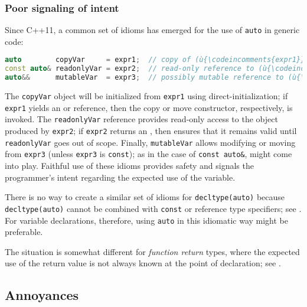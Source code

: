 \subsubsection[Poor signaling of intent]{Poor signaling of intent}\label{poor-signaling-of-intent}

Since C++11, a common set of idioms has emerged for the use of
\lstinline!auto! in generic code:

\begin{lstlisting}[language=C++]
auto        copyVar     = expr1;  // copy of (ù{\codeincomments{expr1}}ù)
const auto& readonlyVar = expr2;  // read-only reference to (ù{\codeincomments{expr1}}ù)
auto&&      mutableVar  = expr3;  // possibly mutable reference to (ù{\codeincomments{expr1}}ù)
\end{lstlisting}
    

The \lstinline!copyVar! object will be initialized from \lstinline!expr1!
using direct-initialization; if \lstinline!expr1! yields an 
or  reference, then the copy or move constructor,
respectively, is invoked. The \lstinline!readonlyVar! reference provides
read-only access to the object produced by \lstinline!expr2!; if
\lstinline!expr2! returns an , then  ensures that it remains valid until \lstinline!readonlyVar! goes
out of scope. Finally, \lstinline!mutableVar! allows modifying or moving
from \lstinline!expr3! (unless \lstinline!expr3! is \lstinline!const!); as in the
case of \lstinline!const!~\lstinline!auto&!, 
might come into play. Faithful use of these idioms provides safety and
signals the programmer's intent regarding the expected use of the
variable.

There is no way to create a similar set of idioms for
\lstinline!decltype(auto)! because \lstinline!decltype(auto)! cannot be
combined with \lstinline!const! or reference type specifiers; see\linebreak%
. For variable
declarations, therefore, using \lstinline!auto! in this idiomatic way might
be preferable.

The situation is somewhat different for \emph{function return} types,
where the expected use of the return value is not always known at the
point of declaration; see .

\subsection[Annoyances]{Annoyances}\label{annoyances-decltypeauto}

